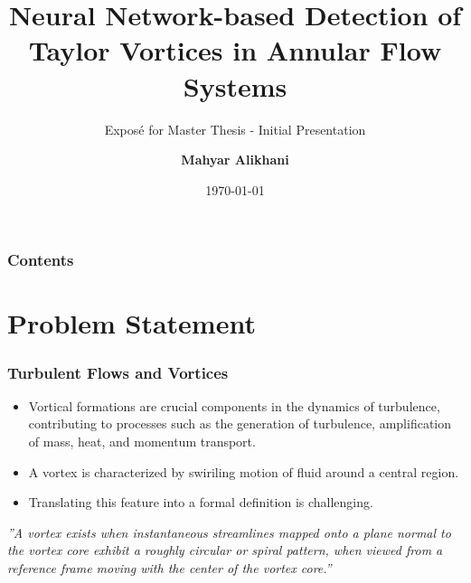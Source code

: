\documentclass[aspectratio=169]{beamer}
\title{Neural Network-based Detection of Taylor Vortices in Annular Flow Systems}
\subtitle{Exposé for Master Thesis - Initial Presentation}
\author{\textbf{Mahyar Alikhani}}
\institute{Institute of Applied Mechanics}
\date{\today}
\begin{document}
\begin{frame}
\titlepage
\end{frame}

\begin{frame}
\frametitle{Contents}
\tableofcontents
\end{frame}

\section{Problem Statement}
\begin{frame}
  \frametitle{Turbulent Flows and Vortices}
  \begin{itemize}
    \item Vortical formations are crucial components in the dynamics of turbulence, contributing to processes such as the generation of turbulence, amplification of mass, heat, and momentum transport.
    \item A vortex is characterized by swiriling motion of fluid around a central region.
    \item Translating this feature into a formal definition is challenging. 
  \end{itemize}
  \centering
  \textit{''A vortex exists when instantaneous streamlines mapped onto a
  plane normal to the vortex core exhibit a roughly circular or spiral
  pattern, when viewed from a reference frame moving with the
  center of the vortex core.''}
\end{frame}

\end{document}
